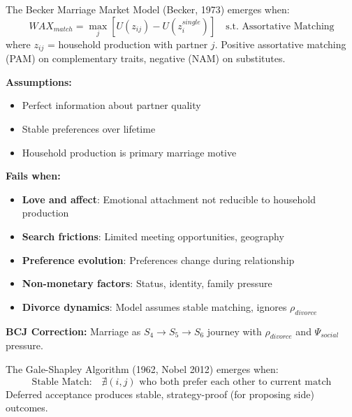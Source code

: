 \begin{theorem}
\label{thm:becker-marriage}
The Becker Marriage Market Model (Becker, 1973) emerges when:
\begin{equation}
\boxed{WAX_{match} = \max_{j} \left[ U(z_{ij}) - U(z_i^{single}) \right] \quad \text{s.t. Assortative Matching}}
\end{equation}
where $z_{ij}$ = household production with partner $j$. Positive assortative matching (PAM) on complementary traits, negative (NAM) on substitutes.
\end{theorem}

\begin{tcolorbox}[colback=red!5!white, colframe=red!75!black, title=Boundary Condition: Where Becker Marriage Fails]
\textbf{Assumptions:}
\begin{itemize}[nosep]
\item Perfect information about partner quality
\item Stable preferences over lifetime
\item Household production is primary marriage motive
\end{itemize}

\textbf{Fails when:}
\begin{itemize}[nosep]
\item \textbf{Love and affect}: Emotional attachment not reducible to household production
\item \textbf{Search frictions}: Limited meeting opportunities, geography
\item \textbf{Preference evolution}: Preferences change during relationship
\item \textbf{Non-monetary factors}: Status, identity, family pressure
\item \textbf{Divorce dynamics}: Model assumes stable matching, ignores $\rho_{divorce}$
\end{itemize}

\textbf{BCJ Correction:} Marriage as $S_4 \to S_5 \to S_6$ journey with $\rho_{divorce}$ and $\Psi_{social}$ pressure.
\end{tcolorbox}


\begin{theorem}
\label{thm:gale-shapley}
The Gale-Shapley Algorithm (1962, Nobel 2012) emerges when:
\begin{equation}
\boxed{\text{Stable Match:} \quad \nexists (i,j) \text{ who both prefer each other to current match}}
\end{equation}
Deferred acceptance produces stable, strategy-proof (for proposing side) outcomes.
\end{theorem}

